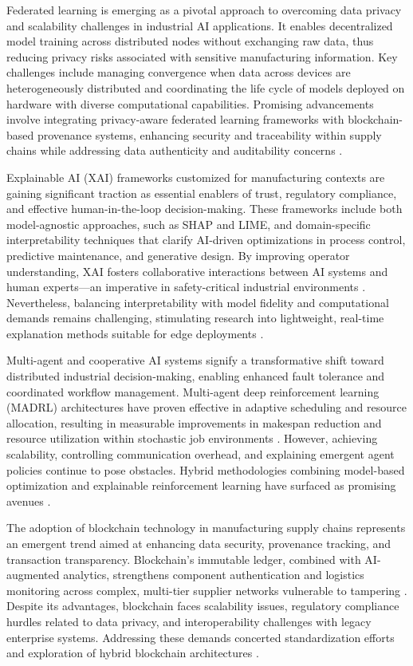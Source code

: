 \documentclass[sigconf]{acmart}
\begin{document}
Federated learning is emerging as a pivotal approach to overcoming data privacy and scalability challenges in industrial AI applications. It enables decentralized model training across distributed nodes without exchanging raw data, thus reducing privacy risks associated with sensitive manufacturing information. Key challenges include managing convergence when data across devices are heterogeneously distributed and coordinating the life cycle of models deployed on hardware with diverse computational capabilities. Promising advancements involve integrating privacy-aware federated learning frameworks with blockchain-based provenance systems, enhancing security and traceability within supply chains while addressing data authenticity and auditability concerns \cite{ref6,ref25,ref41}.

Explainable AI (XAI) frameworks customized for manufacturing contexts are gaining significant traction as essential enablers of trust, regulatory compliance, and effective human-in-the-loop decision-making. These frameworks include both model-agnostic approaches, such as SHAP and LIME, and domain-specific interpretability techniques that clarify AI-driven optimizations in process control, predictive maintenance, and generative design. By improving operator understanding, XAI fosters collaborative interactions between AI systems and human experts—an imperative in safety-critical industrial environments \cite{ref35,ref44}. Nevertheless, balancing interpretability with model fidelity and computational demands remains challenging, stimulating research into lightweight, real-time explanation methods suitable for edge deployments \cite{ref38}.

Multi-agent and cooperative AI systems signify a transformative shift toward distributed industrial decision-making, enabling enhanced fault tolerance and coordinated workflow management. Multi-agent deep reinforcement learning (MADRL) architectures have proven effective in adaptive scheduling and resource allocation, resulting in measurable improvements in makespan reduction and resource utilization within stochastic job environments \cite{ref29}. However, achieving scalability, controlling communication overhead, and explaining emergent agent policies continue to pose obstacles. Hybrid methodologies combining model-based optimization and explainable reinforcement learning have surfaced as promising avenues \cite{ref29,ref37}.

The adoption of blockchain technology in manufacturing supply chains represents an emergent trend aimed at enhancing data security, provenance tracking, and transaction transparency. Blockchain's immutable ledger, combined with AI-augmented analytics, strengthens component authentication and logistics monitoring across complex, multi-tier supplier networks vulnerable to tampering \cite{ref25}. Despite its advantages, blockchain faces scalability issues, regulatory compliance hurdles related to data privacy, and interoperability challenges with legacy enterprise systems. Addressing these demands concerted standardization efforts and exploration of hybrid blockchain architectures \cite{ref41}.
\end{document}
